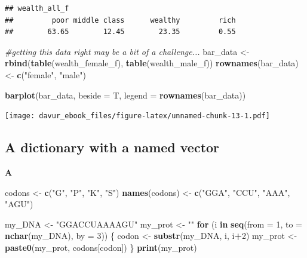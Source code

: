 \documentclass[]{book}
\newenvironment{Shaded}{\begin{snugshade}}{\end{snugshade}}
\newcommand{\CommentTok}[1]{\textcolor[rgb]{0.56,0.35,0.01}{\textit{#1}}}
\newcommand{\ControlFlowTok}[1]{\textcolor[rgb]{0.13,0.29,0.53}{\textbf{#1}}}
\newcommand{\DataTypeTok}[1]{\textcolor[rgb]{0.13,0.29,0.53}{#1}}
\newcommand{\DecValTok}[1]{\textcolor[rgb]{0.00,0.00,0.81}{#1}}
\newcommand{\KeywordTok}[1]{\textcolor[rgb]{0.13,0.29,0.53}{\textbf{#1}}}
\newcommand{\NormalTok}[1]{#1}
\newcommand{\OperatorTok}[1]{\textcolor[rgb]{0.81,0.36,0.00}{\textbf{#1}}}
\newcommand{\StringTok}[1]{\textcolor[rgb]{0.31,0.60,0.02}{#1}}
\begin{document}
\begin{verbatim}
## wealth_all_f
##         poor middle class      wealthy         rich 
##        63.65        12.45        23.35         0.55
\end{verbatim}

\begin{Shaded}
\begin{Highlighting}[]
\CommentTok{#getting this data right may be a bit of a challenge...}
\NormalTok{bar_data <-}\StringTok{ }\KeywordTok{rbind}\NormalTok{(}\KeywordTok{table}\NormalTok{(wealth_female_f), }\KeywordTok{table}\NormalTok{(wealth_male_f))}
\KeywordTok{rownames}\NormalTok{(bar_data) <-}\StringTok{ }\KeywordTok{c}\NormalTok{(}\StringTok{"female"}\NormalTok{, }\StringTok{"male"}\NormalTok{)}

\KeywordTok{barplot}\NormalTok{(bar_data, }\DataTypeTok{beside =}\NormalTok{ T, }\DataTypeTok{legend =} \KeywordTok{rownames}\NormalTok{(bar_data))}
\end{Highlighting}
\end{Shaded}

\texttt{[image: davur\_ebook\_files/figure-latex/unnamed-chunk-13-1.pdf]}

\hypertarget{a-dictionary-with-a-named-vector-1}{%
\subsection{A dictionary with a named vector}\label{a-dictionary-with-a-named-vector-1}}

\textbf{A}

\begin{Shaded}
\begin{Highlighting}[]
\NormalTok{codons <-}\StringTok{ }\KeywordTok{c}\NormalTok{(}\StringTok{"G"}\NormalTok{, }\StringTok{"P"}\NormalTok{, }\StringTok{"K"}\NormalTok{, }\StringTok{"S"}\NormalTok{)}
\KeywordTok{names}\NormalTok{(codons) <-}\StringTok{ }\KeywordTok{c}\NormalTok{(}\StringTok{"GGA"}\NormalTok{, }\StringTok{"CCU"}\NormalTok{, }\StringTok{"AAA"}\NormalTok{, }\StringTok{"AGU"}\NormalTok{)}

\NormalTok{my_DNA <-}\StringTok{ "GGACCUAAAAGU"}
\NormalTok{my_prot <-}\StringTok{ ""}
\ControlFlowTok{for}\NormalTok{ (i }\ControlFlowTok{in} \KeywordTok{seq}\NormalTok{(}\DataTypeTok{from =} \DecValTok{1}\NormalTok{, }\DataTypeTok{to =} \KeywordTok{nchar}\NormalTok{(my_DNA), }\DataTypeTok{by =} \DecValTok{3}\NormalTok{)) \{}
\NormalTok{        codon <-}\StringTok{ }\KeywordTok{substr}\NormalTok{(my_DNA, i, i}\OperatorTok{+}\DecValTok{2}\NormalTok{)}
\NormalTok{        my_prot <-}\StringTok{ }\KeywordTok{paste0}\NormalTok{(my_prot, codons[codon])}
\NormalTok{\}}
\KeywordTok{print}\NormalTok{(my_prot)}
\end{Highlighting}
\end{Shaded}
\end{document}
